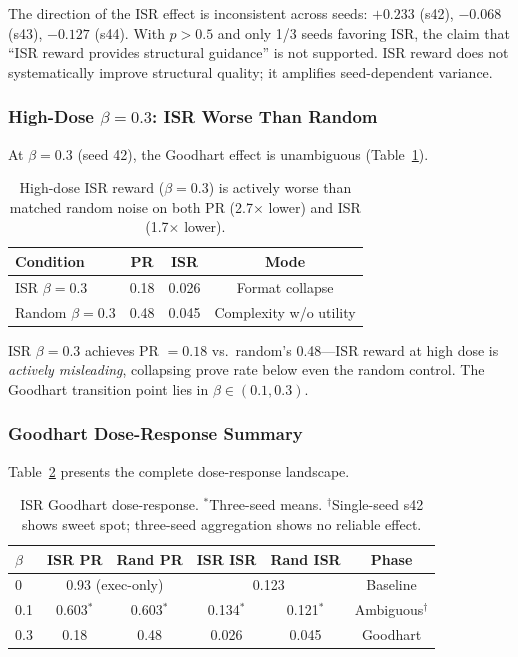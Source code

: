 \documentclass[11pt,a4paper]{article}
\begin{document}
The direction of the ISR effect is inconsistent across seeds: $+0.233$ (s42), $-0.068$ (s43), $-0.127$ (s44).
With $p > 0.5$ and only 1/3 seeds favoring ISR, the claim that ``ISR reward provides structural guidance'' is not supported.
ISR reward does not systematically improve structural quality; it amplifies seed-dependent variance.

\subsubsection{High-Dose $\beta{=}0.3$: ISR Worse Than Random}

At $\beta{=}0.3$ (seed 42), the Goodhart effect is unambiguous (Table~\ref{tab:high_beta}).

\begin{table}[t]
\centering
\small
\begin{tabular}{lccc}
\toprule
\textbf{Condition} & \textbf{PR} & \textbf{ISR} & \textbf{Mode} \\
\midrule
ISR $\beta{=}0.3$ & 0.18 & 0.026 & Format collapse \\
Random $\beta{=}0.3$ & 0.48 & 0.045 & Complexity w/o utility \\
\bottomrule
\end{tabular}
\caption{High-dose ISR reward ($\beta{=}0.3$) is actively worse than matched random noise on both PR (2.7$\times$ lower) and ISR (1.7$\times$ lower).}
\label{tab:high_beta}
\end{table}

ISR $\beta{=}0.3$ achieves PR $= 0.18$ vs.\ random's 0.48---ISR reward at high dose is \emph{actively misleading}, collapsing prove rate below even the random control.
The Goodhart transition point lies in $\beta \in (0.1, 0.3)$.

\subsubsection{Goodhart Dose-Response Summary}

Table~\ref{tab:dose_response} presents the complete dose-response landscape.

\begin{table}[t]
\centering
\small
\begin{tabular}{lccccc}
\toprule
$\beta$ & \textbf{ISR PR} & \textbf{Rand PR} & \textbf{ISR ISR} & \textbf{Rand ISR} & \textbf{Phase} \\
\midrule
0 & \multicolumn{2}{c}{0.93 (exec-only)} & \multicolumn{2}{c}{0.123} & Baseline \\
0.1 & 0.603$^*$ & 0.603$^*$ & 0.134$^*$ & 0.121$^*$ & Ambiguous$^\dagger$ \\
0.3 & 0.18 & 0.48 & 0.026 & 0.045 & Goodhart \\
\bottomrule
\end{tabular}
\caption{ISR Goodhart dose-response. $^*$Three-seed means. $^\dagger$Single-seed s42 shows sweet spot; three-seed aggregation shows no reliable effect.}
\label{tab:dose_response}
\end{table}
\end{document}
